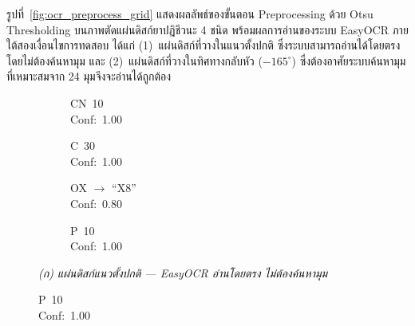 รูปที่~\ref{fig:ocr_preprocess_grid} แสดงผลลัพธ์ของขั้นตอน Preprocessing ด้วย Otsu Thresholding บนภาพตัดแผ่นดิสก์ยาปฏิชีวนะ 4 ชนิด พร้อมผลการอ่านของระบบ EasyOCR ภายใต้สองเงื่อนไขการทดสอบ ได้แก่ (1)~แผ่นดิสก์ที่วางในแนวตั้งปกติ ซึ่งระบบสามารถอ่านได้โดยตรงโดยไม่ต้องค้นหามุม และ (2)~แผ่นดิสก์ที่วางในทิศทางกลับหัว ($-165^\circ$) ซึ่งต้องอาศัยระบบค้นหามุมที่เหมาะสมจาก 24 มุมจึงจะอ่านได้ถูกต้อง

\begin{figure}[H]
  \centering
  \begin{subfigure}[b]{0.23\textwidth}
    \centering
    \caption*{CN~10\\Conf:~1.00}
  \end{subfigure}\hfill
  \begin{subfigure}[b]{0.23\textwidth}
    \centering
    \caption*{C~30\\Conf:~1.00}
  \end{subfigure}\hfill
  \begin{subfigure}[b]{0.23\textwidth}
    \centering
    \caption*{OX $\to$ ``X8''\\Conf:~0.80}
  \end{subfigure}\hfill
  \begin{subfigure}[b]{0.23\textwidth}
    \centering
    \caption*{P~10\\Conf:~1.00}
  \end{subfigure}

  \vspace{6pt}
  \begin{center}\small\textit{(ก) แผ่นดิสก์แนวตั้งปกติ — EasyOCR อ่านโดยตรง ไม่ต้องค้นหามุม}\end{center}


\end{figure}

